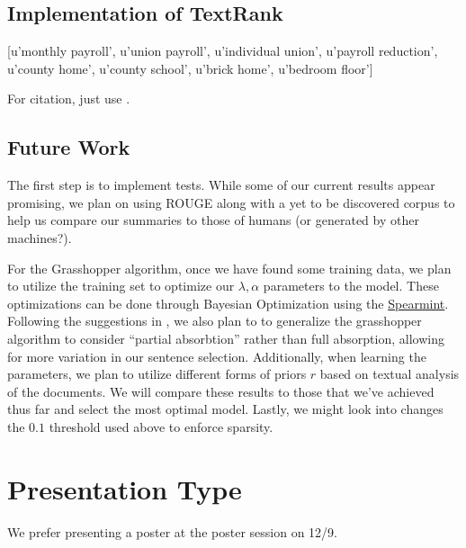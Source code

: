 \documentclass[10pt]{article}
\begin{document}
\subsection{Implementation of TextRank}
\label{sec:textrank}
[u'monthly payroll',
 u'union payroll',
 u'individual union',
 u'payroll reduction',
 u'county home',
 u'county school',
 u'brick home',
 u'bedroom floor']

For citation, just use \cite{textrank}.

\subsection{Future Work}
\label{sec:future_work}
The first step is to implement tests. While some of our current results appear promising, we plan on using ROUGE \cite{rouge} along with a yet to be discovered corpus to help us compare our summaries to those of humans (or generated by other machines?).

For the Grasshopper algorithm, once we have found some training data, we plan to utilize the training set to optimize our $\lambda, \alpha$ parameters to the model. These optimizations can be done through Bayesian Optimization using the \href{https://github.com/HIPS/Spearmint}{Spearmint}. Following the suggestions in \cite{grasshopper}, we also plan to to generalize the grasshopper algorithm to consider ``partial absorbtion'' rather than full absorption, allowing for more variation in our sentence selection. Additionally, when learning the parameters, we plan to utilize different forms of priors $r$ based on textual analysis of the documents. We will compare these results to those that we've achieved thus far and select the most optimal model. Lastly, we might look into changes the $0.1$ threshold used above to enforce sparsity.


\section{Presentation Type}
We prefer presenting a poster at the poster session on 12/9.



\end{document}
